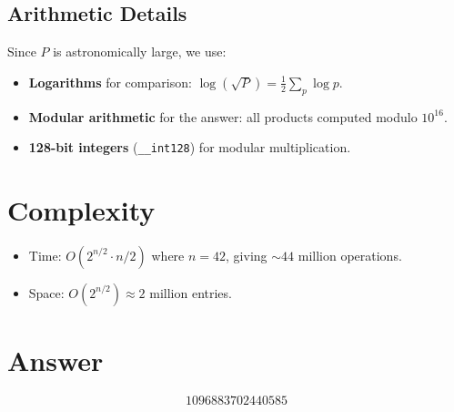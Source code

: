 \documentclass[12pt]{article}
\begin{document}
\subsection{Arithmetic Details}
Since $P$ is astronomically large, we use:
\begin{itemize}
    \item \textbf{Logarithms} for comparison: $\log(\sqrt{P}) = \frac{1}{2}\sum_p \log p$.
    \item \textbf{Modular arithmetic} for the answer: all products computed modulo $10^{16}$.
    \item \textbf{128-bit integers} (\texttt{\_\_int128}) for modular multiplication.
\end{itemize}

\section{Complexity}
\begin{itemize}
    \item Time: $O(2^{n/2} \cdot n/2)$ where $n = 42$, giving $\sim 44$ million operations.
    \item Space: $O(2^{n/2}) \approx 2$ million entries.
\end{itemize}

\section{Answer}

\[
\boxed{1096883702440585}
\]
\end{document}
